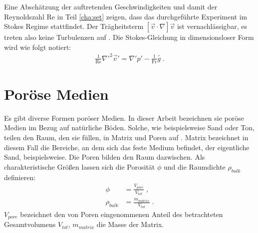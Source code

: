Eine Abschätzung der auftretenden Geschwindigkeiten und damit der Reynoldszahl Re in Teil \ref{cha:set} zeigen, dass das durchgeführte Experiment im Stokes Regime stattfindet. Der Trägheitsterm $\left[ \vec{v} \cdot \nabla \right] \vec{v}$  ist vernachlässigbar, es treten also keine Turbulenzen auf \citep{roth2005}. Die Stokes-Gleichung in dimensionsloser Form wird wie folgt notiert:
\begin{align}
 \frac{1}{\mathrm{Re}}\nabla'^2\vec{v}' = \nabla'p' - \frac{1}{\mathrm{Fr}}\hat{g} \; .
\end{align}







\section{Poröse Medien}
\label{sec:por}

Es gibt diverse Formen poröser Medien. In dieser Arbeit bezeichnen sie poröse Medien im Bezug auf natürliche Böden. Solche, wie beispielsweise Sand oder Ton, teilen den Raum, den sie füllen, in Matrix und Poren auf \citep{roth2005}. Matrix bezeichnet in diesem Fall die Bereiche, an dem sich das feste Medium befindet, der eigentliche Sand, beispielsweise. Die Poren bilden den Raum dazwischen.
Als charakteristische Größen lassen sich die Porosität $\phi$ und die Raumdichte $\rho_{bulk}$ definieren:
\begin{align}
 \phi &= \frac{V_{pore}}{V_{tot}}  \; ,\\
 \rho_{bulk} &= \frac{m_{matrix}}{V_{tot}} \; . %
\end{align}
$V_{pore}$ bezeichnet den von Poren eingenommenen Anteil des betrachteten Gesamtvolumens $V_{tot}$, $m_{matrix}$ die Masse der Matrix. 

